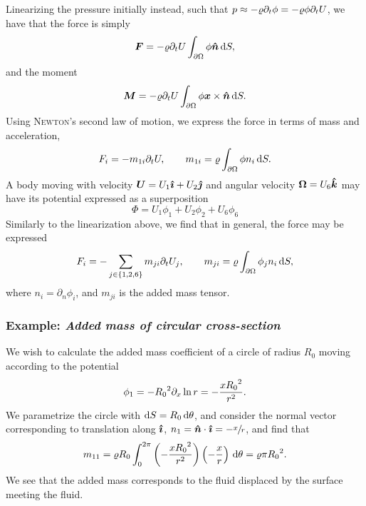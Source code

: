 Linearizing the pressure initially instead, such that $p \approx -\varrho \partial_t\phi = -\varrho\phi\partial_t U$, we have that the force is simply
\[
    \bm{F} = -\varrho \partial_t U \int_{\partial\Omega} \phi\bm{\hat{n}} \,\mathrm{d} S,
\]
and the moment
\[
    \bm{M} = -\varrho \partial_t U \int_{\partial\Omega} \phi \bm{x}\times\bm{\hat{n}} \,\mathrm{d} S.
\]
Using \textsc{Newton}'s second law of motion, we express the force in terms of mass and acceleration,
\[
    F_i = -m_{1i} \partial_t U, \qquad m_{1i} = \varrho\int_{\partial\Omega} \phi n_i \,\mathrm{d} S.
\]
A body moving with velocity $\bm{U} = U_1 \bm{\hat{\imath}} + U_2 \bm{\hat{\jmath}}$ and angular velocity $\bm{\Omega} = U_6 \bm{\hat{k}}$ may have its potential expressed as a superposition
\[
    \Phi = U_1 \phi_1 + U_2 \phi_2 + U_6 \phi_6
\]
Similarly to the linearization above, we find that in general, the force may be expressed
\[
    F_i = -\sum_{j \in \{1,2,6\}} m_{ji} \partial_t U_j, \qquad m_{ji} = \varrho \int_{\partial\Omega} \phi_j n_i \,\mathrm{d} S,
\]
where $n_i = \partial_n \phi_i$, and $m_{ji}$ is the added mass tensor.

\subsubsection*{Example: \emph{Added mass of circular cross-section}}
We wish to calculate the added mass coefficient of a circle of radius $R_0$ moving according to the potential
\[
    \phi_1 = -{R_0}^2 \partial_x\ln{r} = -\frac{x{R_0}^2}{r^2}.
\]
We parametrize the circle with $\mathrm{d} S = R_0 \,\mathrm{d}\theta$, and consider the normal vector corresponding to translation along $\bm{\hat{\imath}}$, $n_1 = \bm{\hat{n}}\cdot\bm{\hat{\imath}} = -\sfrac{x}{r}$, and find that
\[
    m_{11} = \varrho R_0 \int_{0}^{2\pi} \left( -\frac{x {R_0}^2}{r^2} \right) \left( -\frac{x}{r} \right) \,\mathrm{d}\theta = \varrho \pi {R_0}^2.
\]
We see that the added mass corresponds to the fluid displaced by the surface meeting the fluid.
